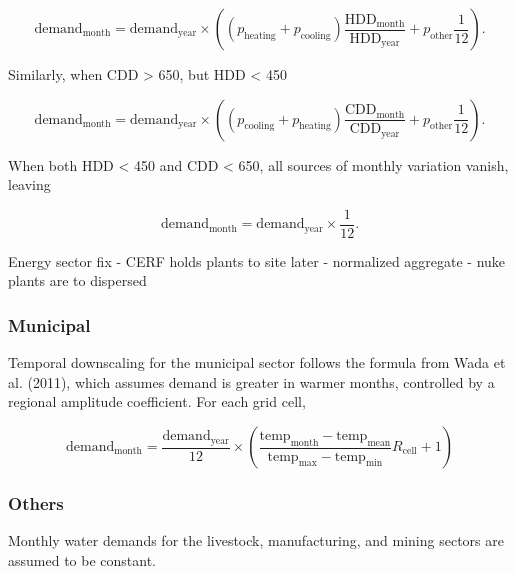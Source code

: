 \documentclass[fleqn,10pt]{wlscirep}
\begin{document}
\begin{equation}
\text{demand}_\text{month} = \text{demand}_\text{year} \times \left( (p_\text{heating} + p_\text{cooling} )\frac{\text{HDD}_\text{month}}{\text{HDD}_\text{year}} + p_\text{other}\frac{1}{12} \right).
\end{equation}

Similarly, when CDD > 650, but HDD < 450

\begin{equation}
\text{demand}_\text{month} = \text{demand}_\text{year} \times \left( (p_\text{cooling} + p_\text{heating} )\frac{\text{CDD}_\text{month}}{\text{CDD}_\text{year}} + p_\text{other}\frac{1}{12} \right).
\end{equation}
    
When both HDD < 450 and CDD < 650, all sources of monthly variation vanish, leaving

\begin{equation}
\text{demand}_\text{month} = \text{demand}_\text{year} \times \frac{1}{12}.
\end{equation}

Energy sector fix - CERF holds plants to site later - normalized aggregate - nuke plants are to dispersed 

\subsubsection*{Municipal}

Temporal downscaling for the municipal sector follows the formula from Wada et al. (2011)\cite{Wada2011}, which assumes demand is greater in warmer months, controlled by a regional amplitude coefficient. For each grid cell,

\begin{equation}
\text{demand}_\text{month} = \frac{\text{demand}_\text{year}}{12} \times \left(\frac{\text{temp}_\text{month} - \text{temp}_\text{mean}}{\text{temp}_\text{max} - \text{temp}_\text{min}}R_\text{cell} + 1\right)
\end{equation}

\subsubsection*{Others}

Monthly water demands for the livestock, manufacturing, and mining sectors are assumed to be constant.
\end{document}
